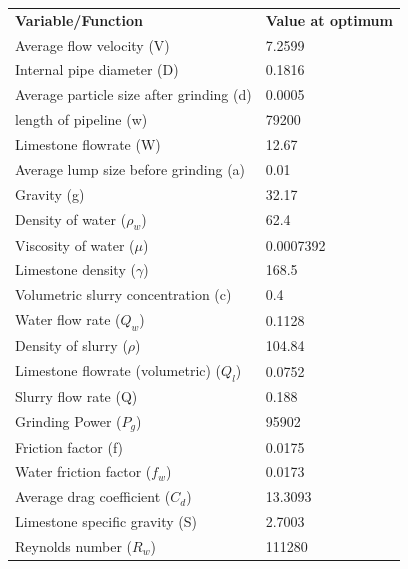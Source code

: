 \documentclass{article}
\begin{document}
\begin{center}
\begin{tabular}{|l|l|}
	\hline
	\textbf{Variable/Function}               & \textbf{Value at optimum} \\
	Average flow velocity (V)                & 7.2599                    \\
	Internal pipe diameter (D)               & 0.1816                    \\
	\cellcolor{yellow}Average particle size after grinding (d) & 0.0005                    \\
	length of pipeline (w)                   & 79200                     \\
	Limestone flowrate (W)                   & 12.67                     \\
	Average lump size before grinding (a)    & 0.01                      \\
	Gravity (g)                              & 32.17                     \\
	Density of water ($\rho_w$)              & 62.4                      \\
	Viscosity of water ($\mu$)               & 0.0007392                 \\
	Limestone density ($\gamma$)             & 168.5                     \\
	\cellcolor{yellow}Volumetric slurry concentration (c)      & 0.4                       \\
	Water flow rate ($Q_w$)                  & 0.1128                    \\
	Density of slurry ($\rho$)               & 104.84                    \\
	Limestone flowrate (volumetric) ($Q_l$)  & 0.0752                    \\
	Slurry flow rate (Q)                     & 0.188                     \\
	Grinding Power ($P_g$)                   & 95902                     \\
	Friction factor (f)                      & 0.0175                    \\
	Water friction factor ($f_w$)            & 0.0173                    \\
	Average drag coefficient ($C_d$)         & 13.3093                   \\
	Limestone specific gravity (S)           & 2.7003                    \\
	Reynolds number ($R_w$)                  & 111280                    \\

\end{tabular}
\end{center}
\end{document}
